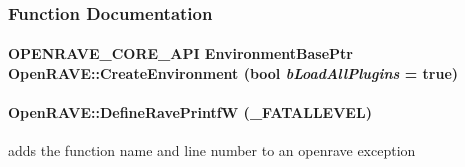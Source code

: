 \subsubsection{Function Documentation}
\hypertarget{namespaceOpenRAVE_ae3bd9d884ea7720a63d49b6212d13f42}{
\paragraph[{CreateEnvironment}]{\setlength{\rightskip}{0pt plus 5cm}OPENRAVE\_\-CORE\_\-API EnvironmentBasePtr OpenRAVE::CreateEnvironment (bool {\em bLoadAllPlugins} = {\ttfamily true})}\hfill}
\label{namespaceOpenRAVE_ae3bd9d884ea7720a63d49b6212d13f42}
\hypertarget{namespaceOpenRAVE_a15759460275c5fa586f4ca9656d998b9}{
\paragraph[{DefineRavePrintfW}]{\setlength{\rightskip}{0pt plus 5cm}OpenRAVE::DefineRavePrintfW (\_\-FATALLEVEL)}\hfill}
\label{namespaceOpenRAVE_a15759460275c5fa586f4ca9656d998b9}


adds the function name and line number to an openrave exception 

